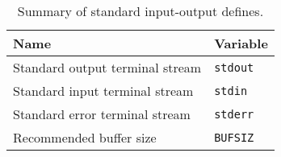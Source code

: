 \begin{table}[htbp!]
    \centering
    \begin{tabular}{l|l} \hline
      Name & Variable\\ \hline
       Standard output terminal stream&  \texttt{stdout} \\
       Standard input terminal stream &  \texttt{stdin} \\
       Standard error terminal stream &  \texttt{stderr} \\
       Recommended buffer size  &  \texttt{BUFSIZ} \\
    \hline\end{tabular}
    \caption{Summary of standard input-output defines.}    
    \label{stdInputOutputDefines.tab}
\end{table}
